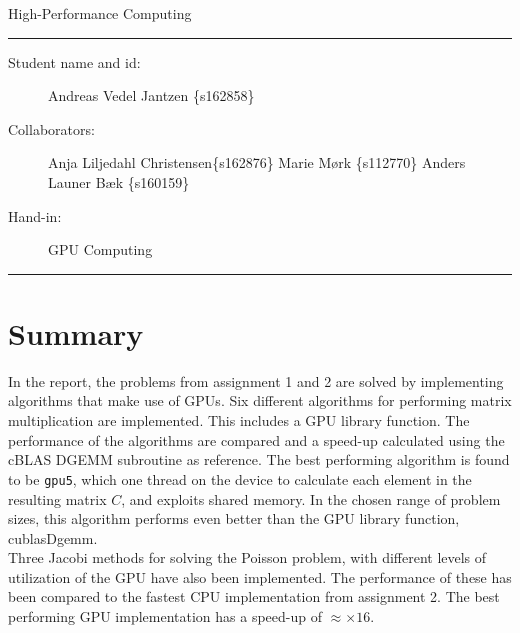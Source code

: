 \begin{center}
{{\Large \sc High-Performance Computing}}
\end{center}
\rule{\textwidth}{1pt}
\begin{description}
\item[Student name and id:] %
 Andreas Vedel Jantzen \{s162858\}
\item[Collaborators:] Anja Liljedahl Christensen\{s162876\} {Marie Mørk \{s112770\}} Anders Launer Bæk \{s160159\} %
\item[Hand-in:] GPU Computing
\end{description}
\rule{\textwidth}{1pt}

\section{Summary}
In the report, the problems from assignment 1 and 2 are solved by implementing algorithms that make use of GPUs. Six different algorithms for performing matrix multiplication are implemented. This includes a GPU library function. The performance of the algorithms are compared and a speed-up calculated using the cBLAS DGEMM subroutine as reference. The best performing algorithm is found to be \texttt{gpu5}, which one thread on the device to calculate each element in the resulting matrix $C$, and exploits shared memory. In the chosen range of problem sizes, this algorithm performs even better than the GPU library function, cublasDgemm. \\
Three Jacobi methods for solving the Poisson problem, with different levels of utilization of the GPU have also been implemented. The performance of these has been compared to the fastest CPU implementation from assignment 2. The best performing GPU implementation has a speed-up of $\approx \times 16$.

